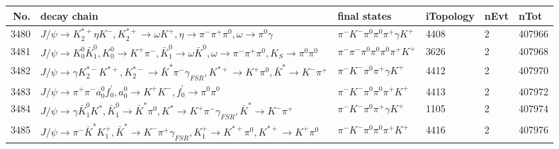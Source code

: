 \begin{table}[htbp] 
\begin{center}
\begin{small}
\begin{tabular}{rlllll}\hline\hline
 No. & decay chain & final states &  iTopology & nEvt & nTot \\\hline
3480&$J/\psi       \rightarrow K_2^{*+}       \eta          K^{-}          , K_2^{*+}        \rightarrow \omega         K^{+}          , \eta           \rightarrow \pi^{-}        \pi^{+}        \pi^{0}        , \omega          \rightarrow \pi^{0}        \gamma       $&$\pi^{-}        K^{-}          \pi^{0}        \pi^{0}        \pi^{+}        \gamma       K^{+}          $& 4408&    2&407966\\
3481&$J/\psi       \rightarrow K_0^{0}        \bar{K}_1^{0} , K_0^{0}         \rightarrow K^{+}          \pi^{-}        , \bar{K}_1^{0}  \rightarrow \omega         \bar{K}^{0}   , \omega          \rightarrow \pi^{-}        \pi^{+}        \pi^{0}        , K_{S}           \rightarrow \pi^{0}        \pi^{0}        $&$\pi^{-}        \pi^{-}        \pi^{0}        \pi^{0}        \pi^{0}        \pi^{+}        K^{+}          $& 3626&    2&407968\\
3482&$J/\psi       \rightarrow \gamma       K_2^{*-}       K^{*+}         , K_2^{*-}        \rightarrow \bar{K}^{*}   \pi^{-}        \gamma_{FSR} , K^{*+}          \rightarrow K^{+}          \pi^{0}        , \bar{K}^{*}    \rightarrow K^{-}          \pi^{+}        $&$\pi^{-}        K^{-}          \pi^{0}        \pi^{+}        \gamma       K^{+}          $& 4412&    2&407970\\
3483&$J/\psi       \rightarrow \pi^{+}        \pi^{-}        a_{0}^{0}      f^{'}_{0}     , a_{0}^{0}       \rightarrow K^{+}          K^{-}          , f^{'}_{0}      \rightarrow \pi^{0}        \pi^{0}        $&$\pi^{-}        K^{-}          \pi^{0}        \pi^{0}        \pi^{+}        K^{+}          $& 4413&    2&407972\\
3484&$J/\psi       \rightarrow \gamma       \bar{K}_1^{0} K^{*}          , \bar{K}_1^{0}  \rightarrow \bar{K}^{*}   \pi^{0}        , K^{*}           \rightarrow K^{+}          \pi^{-}        \gamma_{FSR} , \bar{K}^{*}    \rightarrow K^{-}          \pi^{+}        $&$\pi^{-}        K^{-}          \pi^{0}        \pi^{+}        \gamma       K^{+}          $& 1105&    2&407974\\
3485&$J/\psi       \rightarrow \pi^{-}        \bar{K}^{*}   K_1^{+}        , \bar{K}^{*}    \rightarrow K^{-}          \pi^{+}        \gamma_{FSR} , K_1^{+}         \rightarrow K^{*+}         \pi^{0}        , K^{*+}          \rightarrow K^{+}          \pi^{0}        $&$\pi^{-}        K^{-}          \pi^{0}        \pi^{0}        \pi^{+}        K^{+}          $& 4416&    2&407976\\

\end{tabular}
\end{small}
\end{center}
\end{table}

